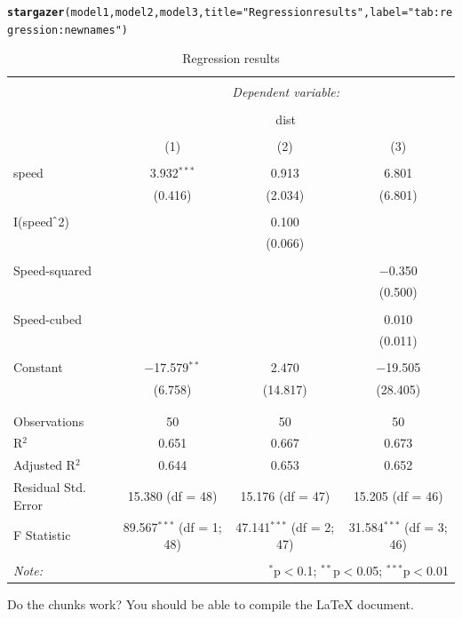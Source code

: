 \documentclass{article}\usepackage[]{graphicx}\usepackage[]{color}
\makeatletter
\newcommand{\hlstr}[1]{\textcolor[rgb]{0.192,0.494,0.8}{#1}}%
\newcommand{\hlstd}[1]{\textcolor[rgb]{0.345,0.345,0.345}{#1}}%
\newcommand{\hlkwc}[1]{\textcolor[rgb]{0.333,0.667,0.333}{#1}}%
\newcommand{\hlkwd}[1]{\textcolor[rgb]{0.737,0.353,0.396}{\textbf{#1}}}%
\newenvironment{kframe}{%
 \def\at@end@of@kframe{}%
 \ifinner\ifhmode%
  \def\at@end@of@kframe{\end{minipage}}%
  \begin{minipage}{\columnwidth}%
 \fi\fi%
 \def\FrameCommand##1{\hskip\@totalleftmargin \hskip-\fboxsep
 \colorbox{shadecolor}{##1}\hskip-\fboxsep
     \hskip-\linewidth \hskip-\@totalleftmargin \hskip\columnwidth}%
 \MakeFramed {\advance\hsize-\width
   \@totalleftmargin\z@ \linewidth\hsize
   \@setminipage}}%
 {\par\unskip\endMakeFramed%
 \at@end@of@kframe}
\makeatother
\begin{document}
\begin{kframe}
\begin{alltt}
\hlkwd{stargazer}\hlstd{(model1, model2, model3,} \hlkwc{title}\hlstd{=}\hlstr{"Regression results"}\hlstd{,} \hlkwc{label}\hlstd{=}\hlstr{"tab:regression:newnames"}\hlstd{)}
\end{alltt}
\end{kframe}
\begin{table}[!htbp] \centering 
  \caption{Regression results} 
  \label{tab:regression:newnames} 
\begin{tabular}{@{\extracolsep{5pt}}lccc} 
\\[-1.8ex]\hline 
\hline \\[-1.8ex] 
 & \multicolumn{3}{c}{\textit{Dependent variable:}} \\ 
\cline{2-4} 
\\[-1.8ex] & \multicolumn{3}{c}{dist} \\ 
\\[-1.8ex] & (1) & (2) & (3)\\ 
\hline \\[-1.8ex] 
 speed & 3.932$^{***}$ & 0.913 & 6.801 \\ 
  & (0.416) & (2.034) & (6.801) \\ 
  & & & \\ 
 I(speed$\hat{\mkern6mu}$2) &  & 0.100 &  \\ 
  &  & (0.066) &  \\ 
  & & & \\ 
 Speed-squared &  &  & $-$0.350 \\ 
  &  &  & (0.500) \\ 
  & & & \\ 
 Speed-cubed &  &  & 0.010 \\ 
  &  &  & (0.011) \\ 
  & & & \\ 
 Constant & $-$17.579$^{**}$ & 2.470 & $-$19.505 \\ 
  & (6.758) & (14.817) & (28.405) \\ 
  & & & \\ 
\hline \\[-1.8ex] 
Observations & 50 & 50 & 50 \\ 
R$^{2}$ & 0.651 & 0.667 & 0.673 \\ 
Adjusted R$^{2}$ & 0.644 & 0.653 & 0.652 \\ 
Residual Std. Error & 15.380 (df = 48) & 15.176 (df = 47) & 15.205 (df = 46) \\ 
F Statistic & 89.567$^{***}$ (df = 1; 48) & 47.141$^{***}$ (df = 2; 47) & 31.584$^{***}$ (df = 3; 46) \\ 
\hline 
\hline \\[-1.8ex] 
\textit{Note:}  & \multicolumn{3}{r}{$^{*}$p$<$0.1; $^{**}$p$<$0.05; $^{***}$p$<$0.01} \\ 
\end{tabular} 
\end{table} 




Do the chunks work? You should be able to compile the \LaTeX{} document.
\end{document}
